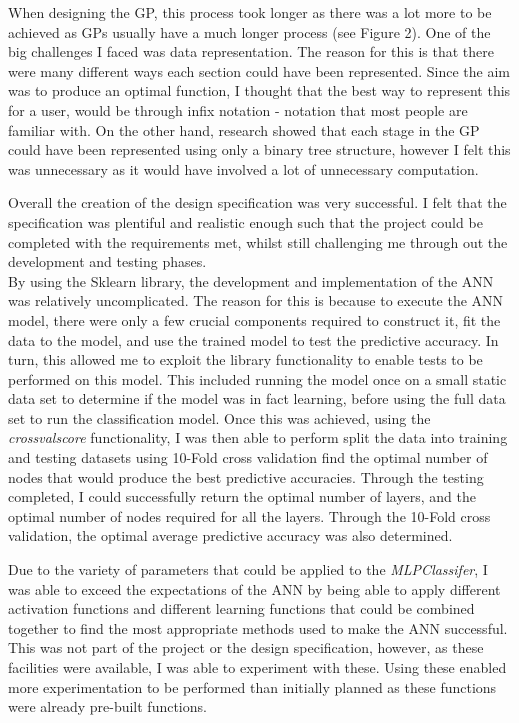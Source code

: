 \documentclass[11pt]{article}
\begin{document}
When designing the GP, this process took longer as there was a lot more to be achieved as GPs usually have a much longer process (see Figure 2). One of the big challenges I faced was data representation. The reason for this is that there were many different ways each section could have been represented. Since the aim was to produce an optimal function, I thought that the best way to represent this for a user, would be through infix notation - notation that most people are familiar with. On the other hand, research showed that each stage in the GP could have been represented using only a binary tree structure, however I felt this was unnecessary as it would have involved a lot of unnecessary computation. 

Overall the creation of the design specification was very successful. I felt that the specification was plentiful and realistic enough such that the project could be completed with the requirements met, whilst still challenging me through out the development and testing phases. \\

By using the Sklearn library, the development and implementation of the ANN was relatively uncomplicated. The reason for this is because to execute the ANN model, there were only a few crucial components required to construct it, fit the data to the model, and use the trained model to test the predictive accuracy. In turn, this allowed me to exploit the library functionality to enable tests to be performed on this model. This included running the model once on a small static data set to determine if the model was in fact learning, before using the full data set to run the classification model. Once this was achieved, using the \textit{cross\textunderscore val\textunderscore score} functionality, I was then able to perform split the data into training and testing datasets using 10-Fold cross validation find the optimal number of nodes that would produce the best predictive accuracies. Through the testing completed, I could successfully return the optimal number of layers, and the optimal number of nodes required for all the layers. Through the 10-Fold cross validation, the optimal average predictive accuracy was also determined.

Due to the variety of parameters that could be applied to the \textit{MLPClassifer}, I was able to exceed the expectations of the ANN by being able to apply different activation functions and different learning functions that could be combined together to find the most appropriate methods used to make the ANN successful. This was not part of the project or the design specification, however, as these facilities were available, I was able to experiment with these. Using these enabled more experimentation to be performed than initially planned as these functions were already pre-built functions. 
\end{document}
